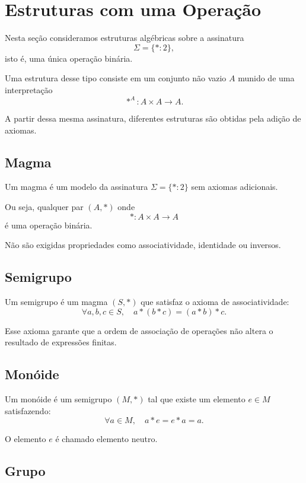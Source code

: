 \documentclass[../../main]{subfiles}
\begin{document}
\section{Estruturas com uma Operação}
\label{sec:matematica:algebra:estruturas-algebricas:uma-operacao}

Nesta seção consideramos estruturas algébricas sobre a assinatura
\[
	\Sigma = \{\ast : 2\},
\]
isto é, uma única operação binária.

Uma estrutura desse tipo consiste em um conjunto não vazio $A$ munido de uma interpretação
\[
	\ast^A : A \times A \to A.
\]

A partir dessa mesma assinatura, diferentes estruturas são obtidas pela adição de axiomas.

\subsection{Magma}

Um magma é um modelo da assinatura $\Sigma = \{\ast : 2\}$ sem axiomas adicionais.

Ou seja, qualquer par $(A,\ast)$ onde
\[
	\ast : A \times A \to A
\]
é uma operação binária.

Não são exigidas propriedades como associatividade, identidade ou inversos.

\subsection{Semigrupo}

Um semigrupo é um magma $(S,\ast)$ que satisfaz o axioma de associatividade:
\[
	\forall a,b,c \in S,\quad a \ast (b \ast c) = (a \ast b) \ast c.
\]

Esse axioma garante que a ordem de associação de operações não altera o resultado de expressões finitas.

\subsection{Monóide}

Um monóide é um semigrupo $(M,\ast)$ tal que existe um elemento $e \in M$ satisfazendo:
\[
	\forall a \in M,\quad a \ast e = e \ast a = a.
\]

O elemento $e$ é chamado elemento neutro.

\subsection{Grupo}
\end{document}
